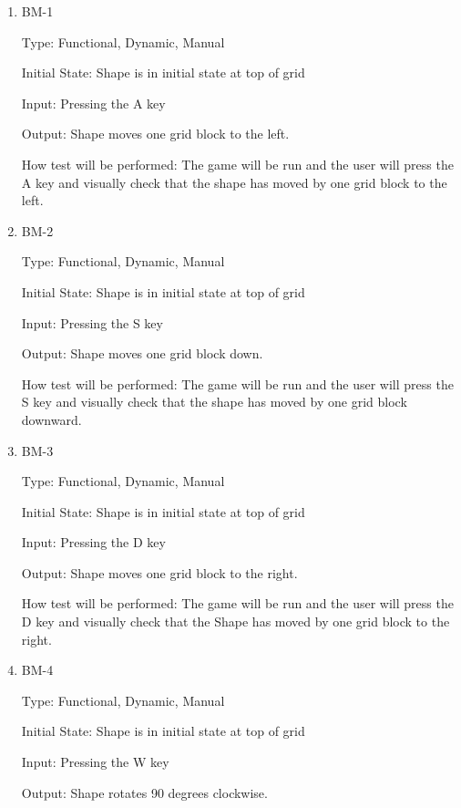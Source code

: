 \documentclass[12pt, titlepage]{article}
\begin{document}
\begin{enumerate}

\item{BM-1\\}

Type: Functional, Dynamic, Manual
					
Initial State: Shape is in initial state at top of grid 
					
Input: Pressing the A key
					
Output: Shape moves one grid block to the left.
					
How test will be performed: The game will be run and the user will press the A key and visually check that the shape has moved by one grid block to the left.


\item{BM-2\\}

Type: Functional, Dynamic, Manual
					
Initial State: Shape is in initial state at top of grid 
					
Input: Pressing the S key
					
Output: Shape moves one grid block down.
					
How test will be performed: The game will be run and the user will press the S key and visually check that the shape has moved by one grid block downward. 

\item{BM-3\\}

Type: Functional, Dynamic, Manual
					
Initial State: Shape is in initial state at top of grid 
					
Input: Pressing the D key
					
Output: Shape moves one grid block to the right.
					
How test will be performed: The game will be run and the user will press the D key and visually check that the Shape has moved by one grid block to the right. 

\item{BM-4\\}

Type: Functional, Dynamic, Manual
					
Initial State: Shape is in initial state at top of grid 
					
Input: Pressing the W key
					
Output: Shape rotates 90 degrees clockwise.
					

\end{enumerate}
\end{document}
